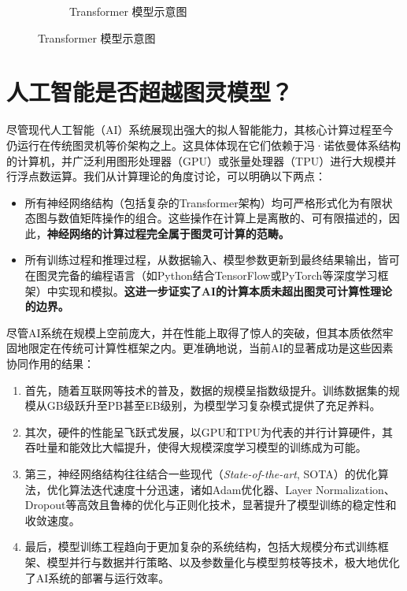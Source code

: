\documentclass[UTF8,openany,zihao=5]{ctexbook}
\begin{document}
\begin{figure}[h]
\begin{subfigure}[b]{0.45\textwidth}
        \caption{Transformer 模型示意图\cite{vaswani2017attention}}
        \label{fig:subimagb}
    \end{subfigure}
    \label{fig:twoimages}
    \vspace{-3ex}
\end{figure}


\section{人工智能是否超越图灵模型？}

尽管现代人工智能（AI）系统展现出强大的拟人智能能力，其核心计算过程至今仍运行在传统图灵机等价架构之上。这具体体现在它们依赖于冯·诺依曼体系结构的计算机，并广泛利用图形处理器（GPU）或张量处理器（TPU）进行大规模并行浮点数运算。我们从计算理论的角度讨论，可以明确以下两点：

\begin{itemize}[noitemsep, topsep=0pt]
  \item 所有神经网络结构（包括复杂的Transformer架构）均可严格形式化为有限状态图与数值矩阵操作的组合。这些操作在计算上是离散的、可有限描述的，因此，\textbf{神经网络的计算过程完全属于图灵可计算的范畴。}
  \item 所有训练过程和推理过程，从数据输入、模型参数更新到最终结果输出，皆可在图灵完备的编程语言（如Python结合TensorFlow或PyTorch等深度学习框架）中实现和模拟。\textbf{这进一步证实了AI的计算本质未超出图灵可计算性理论的边界。}
\end{itemize}

尽管AI系统在规模上空前庞大，并在性能上取得了惊人的突破，但其本质依然牢固地限定在传统可计算性框架之内。更准确地说，当前AI的显著成功是这些因素协同作用的结果：

\begin{enumerate}[noitemsep, topsep=0pt]
 \item 首先，随着互联网等技术的普及，数据的规模呈指数级提升。训练数据集的规模从GB级跃升至PB甚至EB级别，为模型学习复杂模式提供了充足养料。
 \item 其次，硬件的性能呈飞跃式发展，以GPU和TPU为代表的并行计算硬件，其吞吐量和能效比大幅提升，使得大规模深度学习模型的训练成为可能。
 \item 第三，神经网络结构往往结合一些现代（\textit{State-of-the-art}, SOTA）的优化算法，优化算法迭代速度十分迅速，诸如Adam优化器、Layer Normalization、Dropout等高效且鲁棒的优化与正则化技术，显著提升了模型训练的稳定性和收敛速度。
 \item 最后，模型训练工程趋向于更加复杂的系统结构，包括大规模分布式训练框架、模型并行与数据并行策略、以及参数量化与模型剪枝等技术，极大地优化了AI系统的部署与运行效率。
\end{enumerate}
\end{document}

